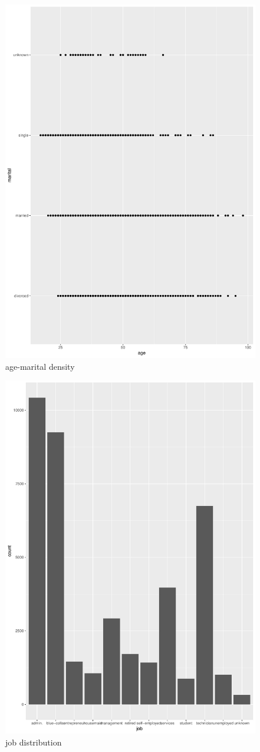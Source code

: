 \documentclass[12pt, a4paper, bibliography=totoc, english]{scrartcl}
\begin{document}
\begin{figure}
	\centering
	\includegraphics[width=0.7\linewidth]{Plot4}
	\caption{age-marital density}
	\label{fig:plot4}
\end{figure}

\begin{figure}
	\centering
	\includegraphics[width=0.7\linewidth]{Plot5}
	\caption{job distribution}
	\label{fig:plot5}
\end{figure}
\end{document}
